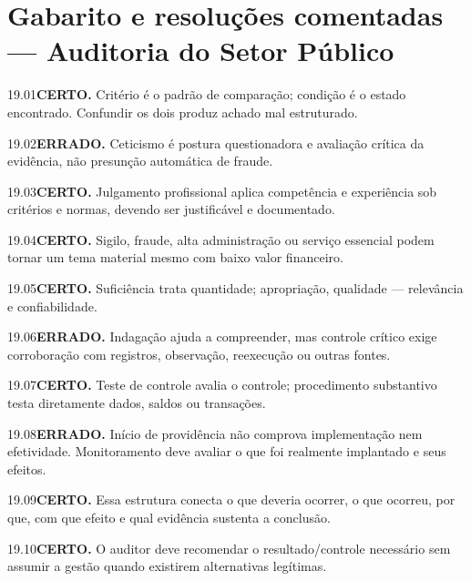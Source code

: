 \section{Gabarito e resoluções comentadas — Auditoria do Setor Público}

\begin{solucao}{19.01}\textbf{CERTO.} Critério é o padrão de comparação; condição é o estado encontrado. Confundir os dois produz achado mal estruturado.\end{solucao}
\begin{solucao}{19.02}\textbf{ERRADO.} Ceticismo é postura questionadora e avaliação crítica da evidência, não presunção automática de fraude.\end{solucao}
\begin{solucao}{19.03}\textbf{CERTO.} Julgamento profissional aplica competência e experiência sob critérios e normas, devendo ser justificável e documentado.\end{solucao}
\begin{solucao}{19.04}\textbf{CERTO.} Sigilo, fraude, alta administração ou serviço essencial podem tornar um tema material mesmo com baixo valor financeiro.\end{solucao}
\begin{solucao}{19.05}\textbf{CERTO.} Suficiência trata quantidade; apropriação, qualidade — relevância e confiabilidade.\end{solucao}
\begin{solucao}{19.06}\textbf{ERRADO.} Indagação ajuda a compreender, mas controle crítico exige corroboração com registros, observação, reexecução ou outras fontes.\end{solucao}
\begin{solucao}{19.07}\textbf{CERTO.} Teste de controle avalia o controle; procedimento substantivo testa diretamente dados, saldos ou transações.\end{solucao}
\begin{solucao}{19.08}\textbf{ERRADO.} Início de providência não comprova implementação nem efetividade. Monitoramento deve avaliar o que foi realmente implantado e seus efeitos.\end{solucao}
\begin{solucao}{19.09}\textbf{CERTO.} Essa estrutura conecta o que deveria ocorrer, o que ocorreu, por que, com que efeito e qual evidência sustenta a conclusão.\end{solucao}
\begin{solucao}{19.10}\textbf{CERTO.} O auditor deve recomendar o resultado/controle necessário sem assumir a gestão quando existirem alternativas legítimas.\end{solucao}

